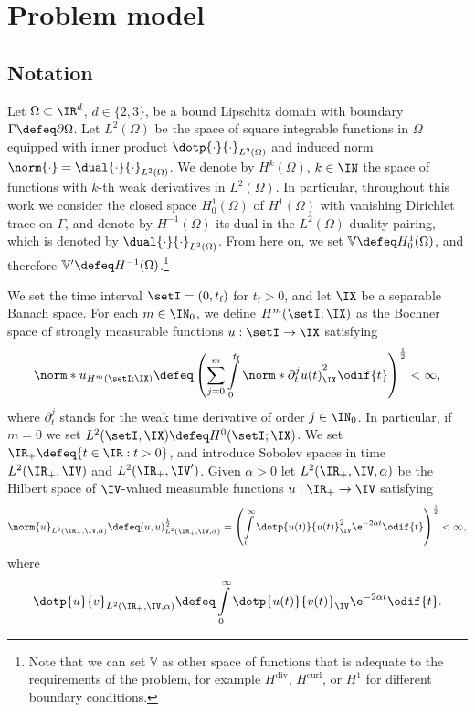 \section{Problem model} 
\label{sec:Problem}

\subsection{Notation}
Let $\Omega \subset \IR^d$, $d \in \{2,3\}$, be a bound Lipschitz domain with boundary $\Gamma \defeq \partial \Omega$. Let $L^2(\Omega)$ be the space of square integrable functions in $\Omega$ equipped with inner product $\dotp{\cdot}{\cdot}_{L^2(\Omega)}$ and induced norm $\norm{\cdot} = \dual{\cdot}{\cdot}_{L^2(\Omega)}$. We denote by $H^k(\Omega)$, $k\in \IN$ the space of functions with $k$-th weak derivatives in $L^2(\Omega)$. In particular, throughout this work we consider the closed space $H^1_0(\Omega)$ of $H^1(\Omega)$ with vanishing Dirichlet trace on $\Gamma$, and denote by $H^{-1}(\Omega)$ its dual in the $L^2(\Omega)$-duality pairing, which is denoted by $\dual{\cdot}{\cdot}_{L^2(\Omega)}$. From here on, we set $\mathbb{V} \defeq H^1_0(\Omega)$, and therefore $\mathbb{V}' \defeq H^{-1}(\Omega)$.\footnote{Note that we can set $\mathbb{V}$ as other space of functions that is adequate to the requirements of the problem, for example $H^{\textrm{div}}$, $H^{\textrm{curl}}$, or $H^1$ for different boundary conditions.}

We set the time interval $\setI=(0,t_{\textrm{f}})$ for $t_{\textrm{f}}>0$, and let $\IX$ be a separable Banach space. For each $m \in \IN_0$, we define $H^m(\setI;\IX)$ as the Bochner space of strongly measurable functions $u: \setI \rightarrow \IX$ satisfying
\begin{equation}
	\norm*{u}_{H^m(\setI ; \IX)} \defeq \left(\sum_{j=0}^m \int\limits_0^{t_{\textrm{f}}} \norm*{\partial_t^j u(t)}_{\IX}^2 \odif{t} \right)^{\frac{1}{2}} < \infty,
\end{equation}
where $\partial^j_t$ stands for the weak time derivative of order $j\in \IN_0$. In particular, if $m=0$ we set $L^2(\setI, \IX)\defeq H^0(\setI; \IX)$. We set $\IR_+ \defeq \{t \in \IR : t>0 \}$, and introduce Sobolev spaces in time $L^2(\IR_+,\IV)$ and $L^2(\IR_+,\IV')$. Given $\alpha>0$ let $L^2(\IR_+,\IV,\alpha)$ be the Hilbert space of $\IV$-valued measurable functions $u:\IR_+ \rightarrow \IV$ satisfying
\begin{align} \label{eq:normalpha}
	\norm{u}_{L^2(\IR_+,\IV,\alpha)} \defeq (u,u)^{\frac{1}{2}}_{L^2(\IR_+,\IV,\alpha)} = \left(\int\limits_{0}^{\infty} \dotp{u(t)}{u(t)}^2_{\IV} \e^{-2\alpha t} \odif{t} \right)^{\frac{1}{2}} < \infty,
\end{align}
where
\begin{align}
	\dotp{u}{v}_{L^2(\IR_+,\IV,\alpha)} \defeq \int\limits_{0}^{\infty} \dotp{u(t)}{v(t)}_{\IV} \e^{-2\alpha t} \odif{t}.
\end{align}

